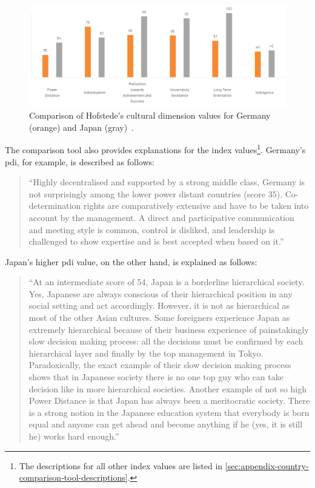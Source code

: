 \begin{figure}[H]
    \centering
    \includegraphics[width=\textwidth]{figures/country-comparison.png}
    \caption{Comparison of Hofstede's cultural dimension values for Germany (orange) and Japan (gray)~\cite{CFG2024}.}
    \label{fig:country-comparison}
\end{figure}

The comparison tool also provides explanations for the index values\footnote{The descriptions for all other index values are listed in \cref{sec:appendix-country-comparison-tool-descriptions}.}. Germany's \ac{pdi}, for example, is described as follows:

\begin{quote}
    ``Highly decentralised and supported by a strong middle class, Germany is not surprisingly among the lower power distant countries (score 35).
    Co-determination rights are comparatively extensive and have to be taken into account by the management.
    A direct and participative communication and meeting style is common, control is disliked, and leadership is challenged to show expertise and is best accepted when based on it.''~\cite{CFG2024}
\end{quote}

Japan's higher \ac{pdi} value, on the other hand, is explained as follows:

\begin{quote}
    ``At an intermediate score of 54, Japan is a borderline hierarchical society.
    Yes, Japanese are always conscious of their hierarchical position in any social setting and act accordingly.
    However, it is not as hierarchical as most of the other Asian cultures.
    Some foreigners experience Japan as extremely hierarchical because of their business experience of painstakingly slow decision making process: all the decisions must be confirmed by each hierarchical layer and finally by the top management in Tokyo.
    Paradoxically, the exact example of their slow decision making process shows that in Japanese society there is no one top guy who can take decision like in more hierarchical societies.
    Another example of not so high Power Distance is that Japan has always been a meritocratic society.
    There is a strong notion in the Japanese education system that everybody is born equal and anyone can get ahead and become anything if he (yes, it is still he) works hard enough.''~\cite{CFG2024}
\end{quote}

